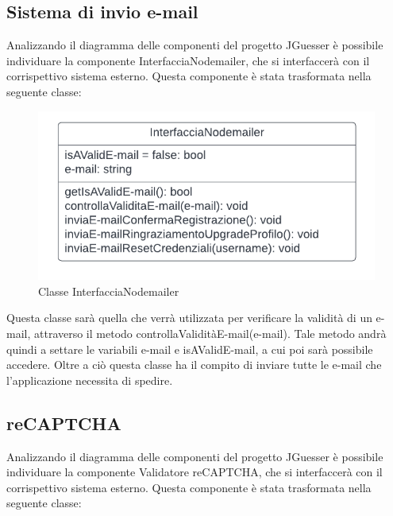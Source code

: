 \newpage
\subsection{Sistema di invio e-mail}
Analizzando il diagramma delle componenti del progetto JGuesser è possibile individuare la componente InterfacciaNodemailer, che si interfaccerà con il corrispettivo sistema esterno. Questa componente è stata trasformata nella seguente classe:

\begin{figure}[!h]
\centering
\includegraphics[scale=0.35]{images/classe_interfaccia_nodemailer.png}
\caption{Classe InterfacciaNodemailer}
\label{fig:classe_interfaccia_nodemailer}
\end{figure}
\noindent
Questa classe sarà quella che verrà utilizzata per verificare la validità di un e-mail, attraverso il metodo controllaValiditàE-mail(e-mail). Tale metodo andrà quindi a settare le variabili e-mail e isAValidE-mail, a cui poi sarà possibile accedere. Oltre a ciò questa classe ha il compito di inviare tutte le e-mail che l'applicazione necessita di spedire.

\subsection{reCAPTCHA}
Analizzando il diagramma delle componenti del progetto JGuesser è possibile individuare la componente Validatore reCAPTCHA, che si interfaccerà con il corrispettivo sistema esterno. Questa componente è stata trasformata nella seguente classe:

